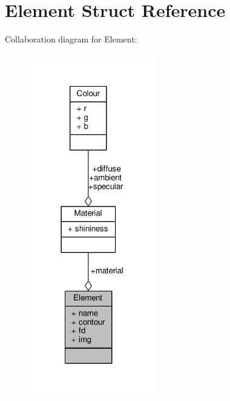 \hypertarget{struct_element}{}\section{Element Struct Reference}
\label{struct_element}


Collaboration diagram for Element\+:\nopagebreak
\begin{figure}[H]
\begin{center}
\leavevmode
\includegraphics[width=158pt]{struct_element__coll__graph}
\end{center}
\end{figure}
